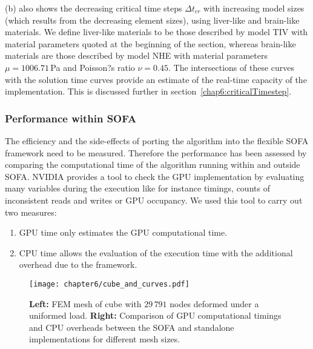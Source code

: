 (b) also shows the decreasing critical time steps $ \Delta t_{cr} $ with increasing model sizes (which results from the decreasing element sizes), using liver-like and brain-like materials. We define liver-like materials to be those described by model TIV with material parameters quoted at the beginning of the section, whereas brain-like materials are those described by model NHE with material parameters $\mu = 1006.71\, $Pa and Poisson?s ratio $\nu = 0.45$. The intersections of these curves with the solution time curves provide an estimate of the real-time capacity of the implementation. This is discussed further in section~\ref{chap6:criticalTimestep}. 

	

		\subsubsection*{Performance within SOFA}
The efficiency and the side-effects of porting the algorithm into the flexible SOFA framework need to be measured. Therefore the performance has been assessed by comparing the computational time of the algorithm running within and outside SOFA. NVIDIA provides a tool to check the GPU implementation by evaluating many variables during the execution like for instance timings, counts of inconsistent reads and writes or GPU occupancy. We used this tool to carry out two measures:
\begin{enumerate}
\item GPU time only estimates the GPU computational time.
\item CPU time allows the evaluation of the execution time with the additional overhead due to the framework.
\end{enumerate}

\begin{figure}
\texttt{[image: chapter6/cube\_and\_curves.pdf]}
\caption [Computational timings within SOFA] {\textbf{Left:} FEM mesh of cube with $29\,791$ nodes deformed under a uniformed load. \textbf{Right:} Comparison of GPU computational timings and CPU overheads between the SOFA and standalone implementations for different mesh sizes.}
\label{chap6:fig-cube_and_curves}
\end{figure}

